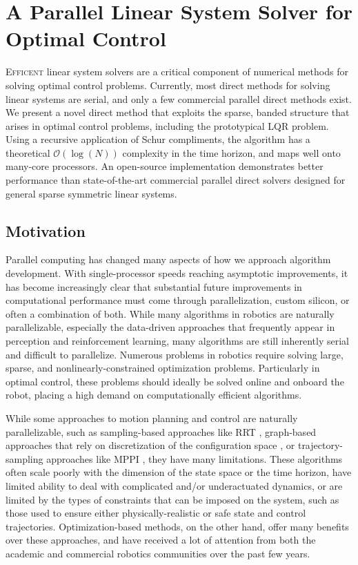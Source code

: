 \documentclass[../root.tex]{subfiles}
\newcommand{\0}{{\transparent{0} \resizebox{\mycellheight}{\mycellheight}{0}}}
\begin{document}
\chapter{A Parallel Linear System Solver for Optimal Control}

\lettrine{E}{fficent} linear system solvers are a critical component of
numerical methods for solving optimal control problems.  Currently, most direct
methods for solving linear systems are serial, and only a few commercial
parallel direct methods exist.  We present a novel direct method that exploits
the sparse, banded structure that arises in optimal control problems, including
the prototypical LQR problem. Using a recursive application of Schur
compliments, the algorithm has a theoretical $\mathcal{O}(\log(N))$ complexity
in the time horizon, and maps well onto many-core processors. An open-source
implementation demonstrates better performance than state-of-the-art commercial
parallel direct solvers designed for general sparse symmetric linear systems.

\section{Motivation} Parallel computing has changed many aspects of how we approach
algorithm development.  With single-processor speeds reaching asymptotic improvements, it
has become increasingly clear that substantial future improvements in computational
performance must come through parallelization, custom silicon, or often a combination of
both. While many algorithms in robotics are naturally parallelizable, especially the
data-driven approaches that frequently appear in perception and reinforcement learning, many
algorithms are still inherently serial and difficult to parallelize.  Numerous problems in robotics require solving large, sparse, and
nonlinearly-constrained optimization problems. Particularly in optimal control, these problems should 
ideally be solved online and onboard the robot, placing a high demand on computationally
efficient algorithms.

While some approaches to motion planning and control are naturally parallelizable, such as
sampling-based approaches like RRT \cite{lavalle_Rapidlyexploring_2001}, graph-based approaches that
rely on discretization of the configuration space \cite{lavalle_Planning_2006}, or
trajectory-sampling approaches like MPPI \cite{williams_Aggressive_2016}, they have many 
limitations. These algorithms often scale poorly with the dimension of the state space or
the time horizon, have limited ability to deal with complicated and/or underactuated
dynamics, or are limited by the types of constraints that can be imposed on the system, such
as those used to ensure either physically-realistic or safe state and control trajectories.
Optimization-based methods, on the other hand, offer many benefits over these approaches, 
and have received a lot of attention from both the academic and commercial robotics
communities over the past few years.
\end{document}
